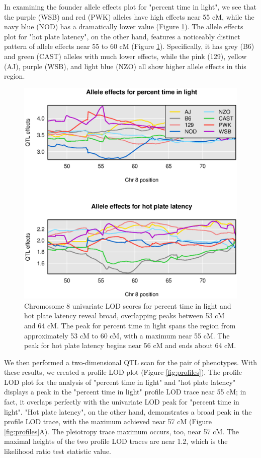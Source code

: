 \documentclass[12pt,twoside, lineno]{gsajnl}
\begin{document}
In examining the founder allele effects plot for "percent time in light", we see that the purple (WSB) and red (PWK) alleles have high effects near 55 cM, while the navy blue (NOD) has a dramatically lower value (Figure \ref{fig:chr8-effects}). The allele effects plot for "hot plate latency", on the other hand, features a noticeably distinct pattern of allele effects near 55 to 60 cM (Figure \ref{fig:chr8-effects}). Specifically, it has grey (B6) and green (CAST) alleles with much lower effects, while the pink (129), yellow (AJ), purple (WSB), and light blue (NZO) all show higher allele effects in this region.

\begin{figure}
\includegraphics[width = \textwidth]{../Rmd/coefs.eps}
\caption{Chromosome 8 univariate LOD scores for percent time in light and hot plate latency reveal broad, overlapping peaks between 53 cM and 64 cM. The peak for percent time in light spans the region from approximately 53 cM to 60 cM, with a maximum near 55 cM. The peak for hot plate latency begins near 56 cM and ends about 64 cM.}
\label{fig:chr8-effects}
\end{figure}




We then performed a two-dimensional QTL scan for the pair of phenotypes. With these results, we created a profile LOD plot (Figure \ref{fig:profiles}). The profile LOD plot for the analysis of "percent time in light" and "hot plate latency" displays a peak in the "percent time in light" profile LOD trace near 55 cM; in fact, it overlaps perfectly with the univariate LOD peak for "percent time in light". "Hot plate latency", on the other hand, demonstrates a broad peak in the profile LOD trace, with the maximum achieved near 57 cM (Figure \ref{fig:profiles}A). The pleiotropy trace maximum occurs, too, near 57 cM. The maximal heights of the two profile LOD traces are near 1.2, which is the likelihood ratio test statistic value.
\end{document}
